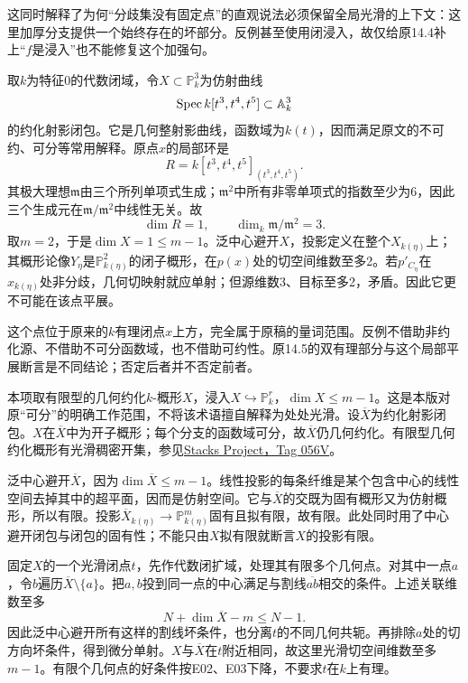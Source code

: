 这同时解释了为何“分歧集没有固定点”的直观说法必须保留全局光滑的上下文：这里加厚分支提供一个始终存在的坏部分。反例甚至使用闭浸入，故仅给原14.4补上“$f$是浸入”也不能修复这个加强句。

取$k$为特征0的代数闭域，令$X\subset\mathbb P^3_k$为仿射曲线
\[
\operatorname{Spec} k[t^3,t^4,t^5]\subset\mathbb A^3_k
\]
的约化射影闭包。它是几何整射影曲线，函数域为$k(t)$，因而满足原文的不可约、可分等常用解释。原点$x$的局部环是
\[
R=k[t^3,t^4,t^5]_{(t^3,t^4,t^5)}.
\]
其极大理想$\mathfrak m$由三个所列单项式生成；$\mathfrak m^2$中所有非零单项式的指数至少为6，因此三个生成元在$\mathfrak m/\mathfrak m^2$中线性无关。故
\[
\dim R=1,\qquad\dim_k\mathfrak m/\mathfrak m^2=3.
\]
取$m=2$，于是$\dim X=1\leq m-1$。泛中心避开$X$，投影定义在整个$X_{k(\eta)}$上；其概形论像$Y_\eta$是$\mathbb P^2_{k(\eta)}$的闭子概形，在$p(x)$处的切空间维数至多2。若$p'_{C_\eta}$在$x_{k(\eta)}$处非分歧，几何切映射就应单射；但源维数3、目标至多2，矛盾。因此它更不可能在该点平展。

这个点位于原来的$k$有理闭点$x$上方，完全属于原稿的量词范围。反例不借助非约化源、不借助不可分函数域，也不借助可约性。原14.5的双有理部分与这个局部平展断言是不同结论；否定后者并不否定前者。

本项取有限型的几何约化$k$-概形$X$，浸入$X\hookrightarrow\mathbb P^r_k$，$\dim X\leq m-1$。这是本版对原“可分”的明确工作范围，不将该术语擅自解释为处处光滑。设$\overline X$为约化射影闭包。$X$在$\overline X$中为开子概形；每个分支的函数域可分，故$\overline X$仍几何约化。有限型几何约化概形有光滑稠密开集，参见\href{https://stacks.math.columbia.edu/tag/056V}{Stacks Project，Tag 056V}。

泛中心避开$\overline X$，因为$\dim\overline X\leq m-1$。线性投影的每条纤维是某个包含中心的线性空间去掉其中的超平面，因而是仿射空间。它与$\overline X$的交既为固有概形又为仿射概形，所以有限。投影$\overline X_{k(\eta)}\to\mathbb P^m_{k(\eta)}$固有且拟有限，故有限。此处同时用了中心避开闭包与闭包的固有性；不能只由$X$拟有限就断言$X$的投影有限。

固定$X$的一个光滑闭点$t$，先作代数闭扩域，处理其有限多个几何点。对其中一点$a$，令$b$遍历$\overline X\setminus\{a\}$。把$a,b$投到同一点的中心满足与割线$\overline{ab}$相交的条件。上述关联维数至多
\[
N+\dim\overline X-m\leq N-1.
\]
因此泛中心避开所有这样的割线坏条件，也分离$t$的不同几何共轭。再排除$a$处的切方向坏条件，得到微分单射。$X$与$\overline X$在$t$附近相同，故这里光滑切空间维数至多$m-1$。有限个几何点的好条件按E02、E03下降，不要求$t$在$k$上有理。

